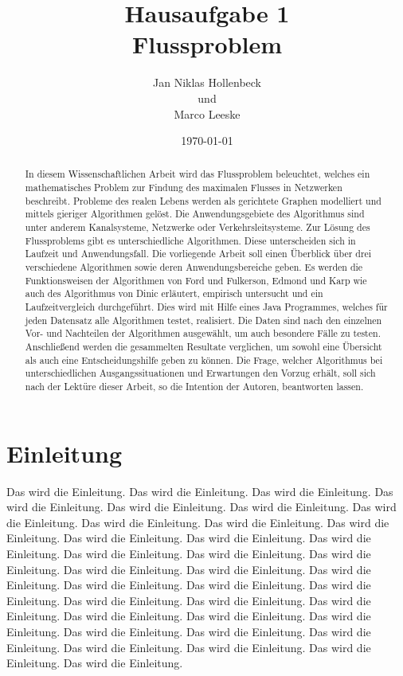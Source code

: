 \documentclass[11pt]{article}
\title{Hausaufgabe 1 \\ Flussproblem}
\author{Jan Niklas Hollenbeck \\ und \\ Marco Leeske}
\date{\today}
\begin{document}
\maketitle

\newpage

\begin{abstract}

In diesem Wissenschaftlichen Arbeit wird das Flussproblem beleuchtet, welches ein mathematisches Problem zur Findung des maximalen Flusses in Netzwerken beschreibt.
 Probleme des realen Lebens werden als gerichtete Graphen modelliert und mittels gieriger Algorithmen gelöst.
 Die Anwendungsgebiete des Algorithmus sind unter anderem Kanalsysteme, Netzwerke oder Verkehrsleitsysteme.
 Zur Lösung des Flussproblems gibt es unterschiedliche Algorithmen. Diese unterscheiden sich in Laufzeit und Anwendungsfall.
 Die vorliegende Arbeit soll einen Überblick über drei verschiedene Algorithmen sowie deren  Anwendungsbereiche geben.
 Es werden die Funktionsweisen der Algorithmen von Ford und Fulkerson, Edmond und Karp wie auch des Algorithmus von Dinic erläutert, empirisch untersucht und ein Laufzeitvergleich durchgeführt.
 Dies wird mit Hilfe eines Java Programmes, welches für jeden Datensatz alle Algorithmen testet, realisiert.
 Die Daten sind nach den einzelnen Vor- und Nachteilen der Algorithmen ausgewählt, um auch besondere  Fälle zu testen.
 Anschließend werden die gesammelten Resultate verglichen, um sowohl eine Übersicht als auch eine Entscheidungshilfe geben zu können.
 Die Frage, welcher Algorithmus bei unterschiedlichen Ausgangssituationen und Erwartungen den Vorzug erhält, soll sich nach der Lektüre dieser Arbeit, so die Intention der Autoren, beantworten lassen. 

\end{abstract}


\section{Einleitung}
\label{Einleitung}

Das wird die Einleitung. Das wird die Einleitung. Das wird die Einleitung. Das wird die Einleitung. Das wird die Einleitung. Das wird die Einleitung. Das wird die Einleitung. Das wird die Einleitung. Das wird die Einleitung. Das wird die Einleitung. Das wird die Einleitung. Das wird die Einleitung. Das wird die Einleitung. Das wird die Einleitung. Das wird die Einleitung. Das wird die Einleitung. Das wird die Einleitung. Das wird die Einleitung. Das wird die Einleitung. Das wird die Einleitung. Das wird die Einleitung. Das wird die Einleitung. Das wird die Einleitung. Das wird die Einleitung. Das wird die Einleitung. Das wird die Einleitung. Das wird die Einleitung. Das wird die Einleitung. Das wird die Einleitung. Das wird die Einleitung. Das wird die Einleitung. Das wird die Einleitung. Das wird die Einleitung. Das wird die Einleitung. Das wird die Einleitung. 
\end{document}
